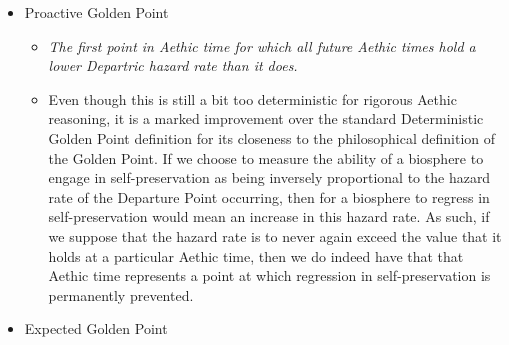 \begin{itemize}
\begin{itemize}
        \item The benefit of this approach is that it incorporates the event horizon-like connotation of a Golden Point, however it does not quite capture the agent-based capability associated with the Golden Point. That is, if we consider the two notions of self-preservation and progress versus regress in the philosophical definition, then to define regress as a biosphere decreasing its probability of the High Golden Point is a very different story than defining regress as a biosphere decreasing its own instantaneous ability to prevent a probability decrease. The latter seems more on par with the notion of self-preservation, being a measure of one's own prevention of threats more so than a measure of the mere frequency of realized threats. As such, the Deterministic Golden Point misses the mark on this on account of instead associating with the former. 
        \item It should further be noted that this approach is not compatible with Aethic reasoning in the first place. That is, it relies on a deterministic and objective nature of data which is not sufficiently Aethic. For such reasons a Deterministic Golden Point will only ever be approximate in scope. 
    \end{itemize}
    \item Proactive Golden Point
    \begin{itemize}
        \item \textit{The first point in Aethic time for which all future Aethic times hold a lower Departric hazard rate than it does.}
        \item Even though this is still a bit too deterministic for rigorous Aethic reasoning, it is a marked improvement over the standard Deterministic Golden Point definition for its closeness to the philosophical definition of the Golden Point. If we choose to measure the ability of a biosphere to engage in self-preservation as being inversely proportional to the hazard rate of the Departure Point occurring, then for a biosphere to regress in self-preservation would mean an increase in this hazard rate. As such, if we suppose that the hazard rate is to never again exceed the value that it holds at a particular Aethic time, then we do indeed have that that Aethic time represents a point at which regression in self-preservation is permanently prevented. 
    \end{itemize}
    \item Expected Golden Point
    \begin{itemize}

\end{itemize}
\end{itemize}
